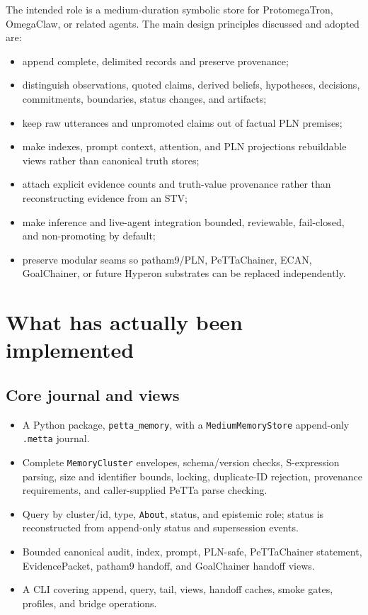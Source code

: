\documentclass[11pt]{article}
\begin{document}
The intended role is a medium-duration symbolic store for ProtomegaTron,
OmegaClaw, or related agents.  The main design principles discussed and adopted
are:

\begin{itemize}
\item append complete, delimited records and preserve provenance;
\item distinguish observations, quoted claims, derived beliefs, hypotheses,
decisions, commitments, boundaries, status changes, and artifacts;
\item keep raw utterances and unpromoted claims out of factual PLN premises;
\item make indexes, prompt context, attention, and PLN projections rebuildable
views rather than canonical truth stores;
\item attach explicit evidence counts and truth-value provenance rather than
reconstructing evidence from an STV;
\item make inference and live-agent integration bounded, reviewable,
fail-closed, and non-promoting by default;
\item preserve modular seams so patham9/PLN, PeTTaChainer, ECAN, GoalChainer, or
future Hyperon substrates can be replaced independently.
\end{itemize}

\section{What has actually been implemented}

\subsection{Core journal and views}

\begin{itemize}
\item A Python package, \texttt{petta\_memory}, with a
\texttt{MediumMemoryStore} append-only \texttt{.metta} journal.
\item Complete \texttt{MemoryCluster} envelopes, schema/version checks,
S-expression parsing, size and identifier bounds, locking, duplicate-ID
rejection, provenance requirements, and caller-supplied PeTTa parse checking.
\item Query by cluster/id, type, \texttt{About}, status, and epistemic role;
status is reconstructed from append-only status and supersession events.
\item Bounded canonical audit, index, prompt, PLN-safe, PeTTaChainer statement,
EvidencePacket, patham9 handoff, and GoalChainer handoff views.
\item A CLI covering append, query, tail, views, handoff caches, smoke gates,
profiles, and bridge operations.
\end{itemize}
\end{document}
